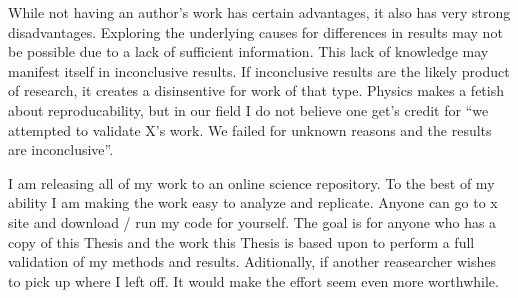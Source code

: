 While not having an author's work has certain advantages, it also has very strong disadvantages.  Exploring the underlying causes for differences in results may not be possible due to a lack of sufficient information.  This lack of knowledge may manifest itself in inconclusive results.  If inconclusive results are the likely product of research, it creates a disinsentive for work of that type.  Physics makes a fetish about reproducability, but in our field I do not believe one get's credit for ``we attempted to validate X's work.  We failed for unknown reasons and the results are inconclusive''.

I am releasing all of my work to an online science repository.  To the best of my ability I am making the work easy to analyze and replicate.  Anyone can go to x site and download / run my code for yourself.  The goal is for anyone who has a copy of this Thesis and the work this Thesis is based upon to perform a full validation of my methods and results.  Aditionally, if another reasearcher wishes to pick up where I left off.  It would make the effort seem even more worthwhile. 


